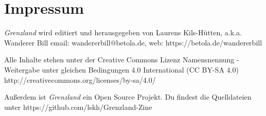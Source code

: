 \documentclass[11pt]{wbzine}
\begin{document}
\section{Impressum}

\textit{Grenzland} wird editiert und 
herausgegeben von Laurens Kils-Hütten,
a.k.a. Wanderer Bill 
email: wandererbill@betola.de, web: https://betola.de/wandererbill

Alle Inhalte stehen unter der Creative Commons Lizenz 
Namensnennung - Weitergabe unter gleichen Bedingungen 4.0 International 
(CC BY-SA 4.0)
http://creativecommons.org/licenses/by-sa/4.0/

Außerdem ist \textit{Grenzland} ein Open Source Projekt. Du
findest die Quelldateien unter https://github.com/lskh/Grenzland-Zine

\end{document}
